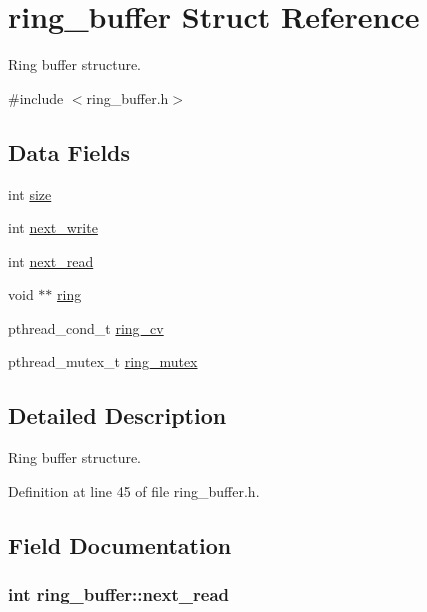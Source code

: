 \hypertarget{structring__buffer}{}\section{ring\+\_\+buffer Struct Reference}
\label{structring__buffer}


Ring buffer structure.  




{\ttfamily \#include $<$ring\+\_\+buffer.\+h$>$}

\subsection*{Data Fields}
\begin{DoxyCompactItemize}
\item 
int \hyperlink{structring__buffer_a0d2f79fe70794fc16c8536b06bff7894}{size}
\item 
int \hyperlink{structring__buffer_af3f14937423dc6d693444d550b498c12}{next\+\_\+write}
\item 
int \hyperlink{structring__buffer_ad905e08b794b74cc49d585bec2e08776}{next\+\_\+read}
\item 
void $\ast$$\ast$ \hyperlink{structring__buffer_a9c694810d59531a5725341dc33d02445}{ring}
\item 
pthread\+\_\+cond\+\_\+t \hyperlink{structring__buffer_add8eae2fb8095b3a680d40f77e4ccf14}{ring\+\_\+cv}
\item 
pthread\+\_\+mutex\+\_\+t \hyperlink{structring__buffer_a02f5f67c7cfb2d9af345d3b2a4763706}{ring\+\_\+mutex}
\end{DoxyCompactItemize}


\subsection{Detailed Description}
Ring buffer structure. 

Definition at line 45 of file ring\+\_\+buffer.\+h.



\subsection{Field Documentation}
\hypertarget{structring__buffer_ad905e08b794b74cc49d585bec2e08776}{}
\subsubsection[{next\+\_\+read}]{\setlength{\rightskip}{0pt plus 5cm}int ring\+\_\+buffer\+::next\+\_\+read}\label{structring__buffer_ad905e08b794b74cc49d585bec2e08776}


